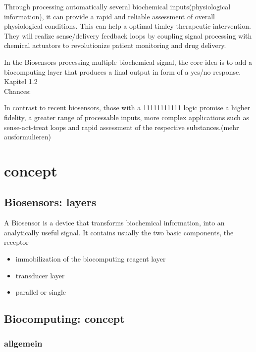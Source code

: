 \documentclass[runningheads]{llncs}
\begin{document}
	Through processing automatically several biochemical inputs(physiological information), it can provide a rapid and reliable assessment of overall physiological conditions. This can help a optimal timley therapeutic intervention. They will realize sense/delivery feedback loops by coupling signal processing with chemical actuators to revolutionize patient monitoring and drug delivery. 
	
	In the Biosensors processing multiple biochemical signal, the core idea is to add a biocomputing layer that produces a final output in form of a yes/no response. Kapitel 1.2\\
	
	Chances:
	
	
	
	
	In contrast to recent biosensors, those with a 11111111111 logic promise a higher fidelity, a greater range of processable inputs, more complex applications such as sense-act-treat loops and rapid assessment of the respective substances.(mehr ausformulieren)
	



\section{concept}
\subsection{Biosensors: layers}
	A Biosensor is a device that transforms biochemical information, into an analytically useful signal. It contains usually the two basic components, the receptor
	\begin{itemize}
		\item immobilization of the biocomputing reagent layer
		\item transducer layer
		\item parallel or single
		
		
	\end{itemize}
\subsection{Biocomputing: concept}
	
	\subsubsection{allgemein}
	
\end{document}
